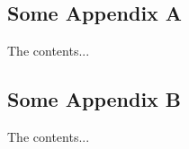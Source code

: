 %
%

\begin{appendices}

\chapter{}

\section{Some Appendix A}
The contents...

\section{Some Appendix B}
The contents...

\end{appendices}